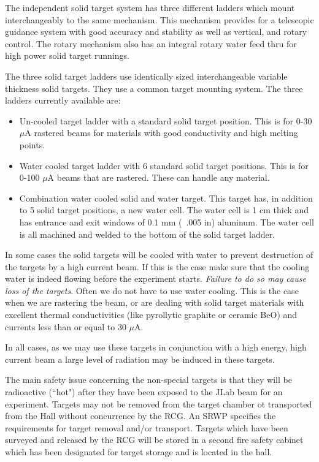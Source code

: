 The independent solid target system has three different ladders which
mount interchangeably to the same mechanism.  This mechanism
provides for a telescopic guidance system with good accuracy
and stability as well as vertical, and rotary control.  The rotary mechanism also
has an integral rotary water feed thru for high power solid target
runnings. 

The three solid target ladders use identically sized interchangeable
variable thickness solid targets.  They use a common target mounting
system.  The three ladders currently available are:

\begin{itemize}
\item{Un-cooled target ladder with a standard solid target position.
This is for 0-30 $\mu$A rastered beams for materials with good
conductivity and high melting points.}
\item{Water cooled target ladder with 6 standard solid target
positions.  This is for 0-100 $\mu$A beams that are rastered.  These
can handle any material.}
\item{Combination water cooled solid and water target.  This target
has, in addition to 5 solid target positions, a new water cell.
The water cell is 1 cm thick and has entrance and exit windows of 0.1
mm (~.005 in) aluminum.  The water cell is all machined and welded to
the bottom of the solid target ladder.}
\end{itemize}

In some cases the solid targets will be cooled with water to prevent
destruction of the targets by a high current beam. If this is the case
make sure that the
cooling water is indeed flowing before the experiment starts.
{\sl Failure to do so may cause loss of the targets}. Often we
do not have to use water cooling. This is the case when we are
rastering the beam, or are dealing with solid target
materials with excellent thermal conductivities (like pyrollytic
graphite or ceramic BeO) and currents less than or equal to 30 $\mu$A.

In all cases, as we may use these targets in conjunction with a high
energy, high current beam a large level of radiation may be induced
in these targets.

The main safety issue concerning the non-special targets is that
they will be radioactive (``hot") after they have been
exposed to the JLab beam for an experiment.
Targets may not be removed from the target chamber ot transported from the Hall without 
concurrence by the RCG. An SRWP specifies the requirements for target removal and/or 
transport. Targets which have been surveyed and released by the RCG will be stored in a 
second fire safety cabinet which has been designated for target storage and is located in 
the hall.

